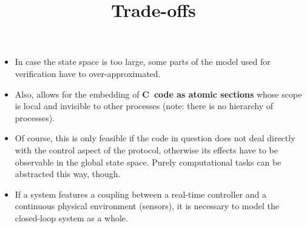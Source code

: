 \documentclass[wide]{slides}
\begin{document}
\begin{slide}
  \title{Trade-offs}

  \begin{itemize}

    \item In case the state space is too large, some parts of the
      model used for verification have to over\hyp{}approximated.

    \item Also, \Promela allows for the embedding of
      \textbf{\textsf{C}~code as atomic sections} whose scope is local
      and invisible to other processes (note: there is no hierarchy of
      processes).

    \item Of course, this is only feasible if the code in question
      does not deal directly with the control aspect of the protocol,
      otherwise its effects have to be observable in the global state
      space. Purely computational tasks can be abstracted this way,
      though.

    \item If a system features a coupling between a real\hyp{}time
      controller and a continuous physical environment (sensors), it
      is necessary to model the closed\hyp{}loop system as a whole.

  \end{itemize}

\end{slide}
\end{document}
